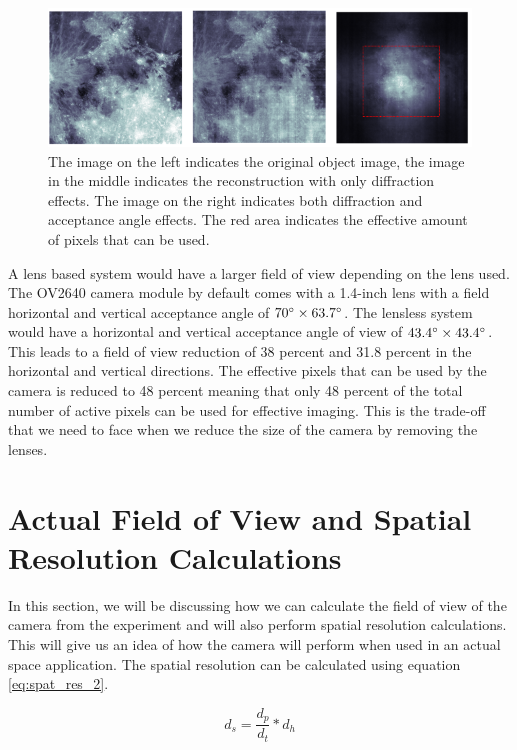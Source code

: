  \begin{figure}[!h]
\centering
\includegraphics[width = \linewidth]{pics/ReconstructionAcce}
\caption{The image on the left indicates the original object image, the image in the middle indicates the reconstruction with only diffraction effects. The image on the right indicates both diffraction and acceptance angle effects. The red area indicates the effective amount of pixels that can be used. }
\label{fig:rec_acc}
\end{figure}
    

A lens based system would have a larger field of view depending on the lens used. The OV2640 camera module by default comes with a 1.4-inch lens with a field horizontal and vertical acceptance angle of $70\degree \times 63.7\degree$\cite{OV2640Arducam}\cite{lenses}. The lensless system would have a horizontal and vertical acceptance angle of view of $43.4\degree \times 43.4\degree$. This leads to a field of view reduction of 38 percent and 31.8 percent in the horizontal and vertical directions. The effective pixels that can be used by the camera is reduced to 48 percent meaning that only 48 percent of the total number of active pixels can be used for effective imaging. This is the trade-off that we need to face when we reduce the size of the camera by removing the lenses.

\section{Actual Field of View and Spatial Resolution Calculations}
In this section, we will be discussing how we can calculate the field of view of the camera from the experiment and will also perform spatial resolution calculations. This will give us an idea of how the camera will perform when used in an actual space application. The spatial resolution can be calculated using equation \ref{eq:spat_res_2}. 

\begin{equation}
\label{eq:spat_res_2}
d_s = \frac{d_p}{d_t} * d_h
\end{equation}


